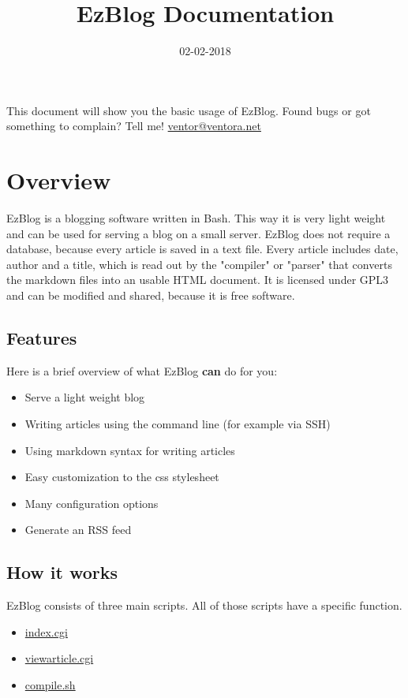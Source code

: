 \documentclass[12pt,a4paper]{article}
\title{EzBlog Documentation}
\date{02-02-2018}
\begin{document}
\maketitle

\tableofcontents

\newpage

This document will show you the basic usage of EzBlog. Found bugs or got something to complain? Tell me! \href{mailto:ventor@ventora.net}{ventor@ventora.net} 

\section{Overview}

EzBlog is a blogging software written in Bash. This way it is very light weight and can be used for serving a blog on a small server. EzBlog does not require a database, because every article is saved in a text file. Every article includes date, author and a title, which is read out by the "compiler" or "parser" that converts the markdown files into an usable HTML document. It is licensed under GPL3 and can be modified and shared, because it is free software.

\subsection{Features}

Here is a brief overview of what EzBlog \textbf{can} do for you:

\begin{itemize}
\item Serve a light weight blog
\item Writing articles using the command line (for example via SSH)
\item Using markdown syntax for writing articles
\item Easy customization to the css stylesheet
\item Many configuration options
\item Generate an RSS feed
\end{itemize}

\subsection{How it works}

EzBlog consists of three main scripts. All of those scripts have a specific function.

\begin{itemize}
\item \hyperref[sec:index.cgi]{index.cgi}
\item \hyperref[sec:viewarticle.cgi]{viewarticle.cgi}
\item \hyperref[sec:compile.sh]{compile.sh}
\end{itemize}
\end{document}
